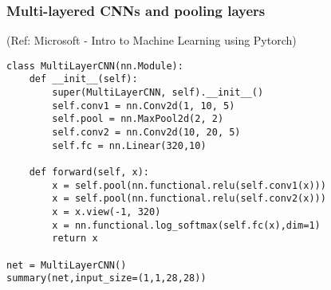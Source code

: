\begin{frame}[fragile] \frametitle{Multi-layered CNNs and pooling layers}

\tiny{(Ref: Microsoft - Intro to Machine Learning using Pytorch)}

\begin{lstlisting}
class MultiLayerCNN(nn.Module):
    def __init__(self):
        super(MultiLayerCNN, self).__init__()
        self.conv1 = nn.Conv2d(1, 10, 5)
        self.pool = nn.MaxPool2d(2, 2)
        self.conv2 = nn.Conv2d(10, 20, 5)
        self.fc = nn.Linear(320,10)

    def forward(self, x):
        x = self.pool(nn.functional.relu(self.conv1(x)))
        x = self.pool(nn.functional.relu(self.conv2(x)))
        x = x.view(-1, 320)
        x = nn.functional.log_softmax(self.fc(x),dim=1)
        return x

net = MultiLayerCNN()
summary(net,input_size=(1,1,28,28))
\end{lstlisting}

\end{frame}

